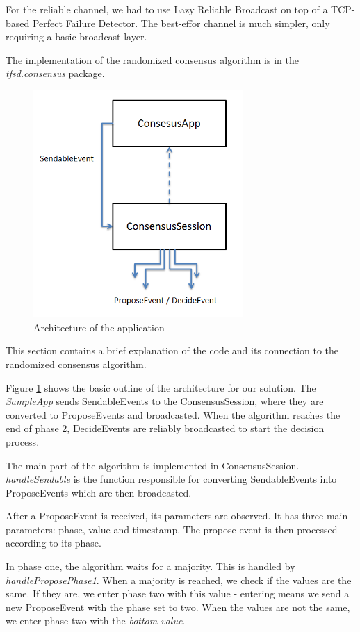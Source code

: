 \documentclass[times, 12pt,twocolumn]{article}
\begin{document}
For the reliable channel, we had to use Lazy Reliable Broadcast on top
of a TCP-based Perfect Failure Detector. The best-effor channel is much simpler, 
only requiring a basic broadcast layer.

The implementation of the randomized consensus algorithm is in the 
\textit{tfsd.consensus} package. 


\begin{figure}[ht!]
\centering
\includegraphics[width=80mm]{arch.png}
\caption{Architecture of the application}
\label{fig:arch}
\end{figure}

This section contains a brief explanation of the code and its connection 
to the randomized consensus algorithm.
 
Figure \ref{fig:arch} shows the basic outline of the architecture for our 
solution. The \textit{SampleApp} sends SendableEvents to the ConsensusSession, 
where they are converted to ProposeEvents and broadcasted. When the algorithm 
reaches the end of phase 2, DecideEvents are reliably broadcasted to start the 
decision process.

The main part of the algorithm is implemented in ConsensusSession. 
\textit{handleSendable} is the function responsible for converting SendableEvents 
into ProposeEvents which are then broadcasted.

After a ProposeEvent is received, its parameters are observed. It has three main 
parameters: phase, value and timestamp. The propose event is then processed according 
to its phase.

In phase one, the algorithm waits for a majority. This is handled by 
\textit{handleProposePhase1}. When a majority is reached, we check if the values 
are the same. If they are, we enter phase two with this value - entering means 
we send a new ProposeEvent with the phase set to two. When the values are not the 
same, we enter phase two with the \textit{bottom value}.
\end{document}
